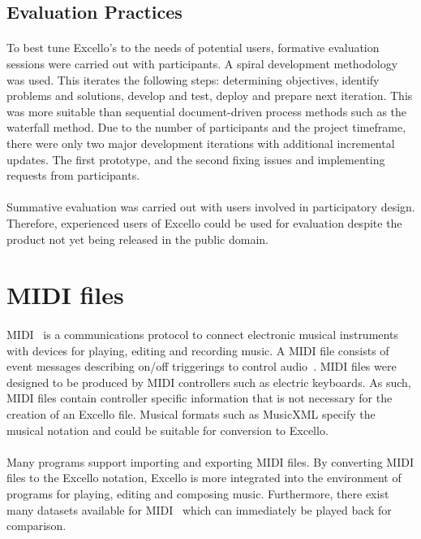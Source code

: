 \subsection{Evaluation Practices}

\paragraph{} To best tune Excello's to the needs of potential users, formative evaluation sessions were carried out with participants. A spiral development methodology~\cite{boehm:spiral} was used. This iterates the following steps: determining objectives, identify problems and solutions, develop and test, deploy and prepare next iteration. This was more suitable than sequential document-driven process methods such as the waterfall method. Due to the number of participants and the project timeframe, there were only two major development iterations with additional incremental updates. The first prototype, and the second fixing issues and implementing requests from participants.

\paragraph{} Summative evaluation was carried out with users involved in participatory design. Therefore, experienced users of Excello could be used for evaluation despite the product not yet being released in the public domain.

\section{MIDI files}

\paragraph{} MIDI~\cite{midiSpec} is a communications protocol to connect electronic musical instruments with devices for playing, editing and recording music. A MIDI file consists of event messages describing on/off triggerings to control audio~\cite{huber:midimanual}. MIDI files were designed to be produced by MIDI controllers such as electric keyboards. As such, MIDI files contain controller specific information that is not necessary for the creation of an Excello file. Musical formats such as MusicXML specify the musical notation and could be suitable for conversion to Excello.

\paragraph{} Many programs support importing and exporting MIDI files. By converting MIDI files to the Excello notation, Excello is more integrated into the environment of programs for playing, editing and composing music. Furthermore, there exist many datasets available for MIDI~\cite{huang:deep} which can immediately be played back for comparison.
